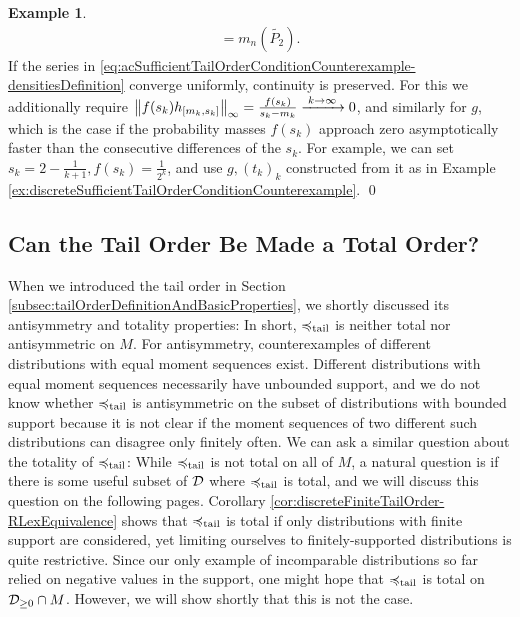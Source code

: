 \documentclass[a4paper,DIV=11]{scrreprt}
\theoremstyle{definition}
\newtheorem{ex}[thm]{Example} %
\begin{document}
\begin{ex}
\begin{multline*}
            = m_n(\tilde{P_2}).
        \end{multline*}
        If the series in \eqref{eq:acSufficientTailOrderConditionCounterexample-densitiesDefinition} converge uniformly, continuity is preserved.
        For this we additionally require $\left\lVert f(s_k) h_{[m_k, s_k]}\right\rVert_\infty = \frac{f(s_k)}{s_k - m_k} \xrightarrow{\;k \to \infty\;} 0$, and similarly for $g$, which is the case if the probability masses $f(s_k)$ approach zero asymptotically faster than the consecutive differences of the $s_k$. For example, we can set $s_k = 2-\frac{1}{k+1}, f(s_k) = \frac{1}{2^k}$, and use $g, (t_k)_k$ constructed from it as in Example \ref{ex:discreteSufficientTailOrderConditionCounterexample}.
        \qed
    \end{ex}
    
    \subsection{Can the Tail Order Be Made a Total Order?}
    \label{subsec:tailOrderTotality}
    When we introduced the tail order in Section \ref{subsec:tailOrderDefinitionAndBasicProperties}, we shortly discussed its antisymmetry and totality properties: In short, $\preccurlyeq_{\text{tail}}$ is neither total nor antisymmetric on $M$. For antisymmetry, counterexamples of different distributions with equal moment sequences exist. Different distributions with equal moment sequences necessarily have unbounded support, and we do not know whether $\preccurlyeq_{\text{tail}}$ is antisymmetric on the subset of distributions with bounded support because it is not clear if the moment sequences of two different such distributions can disagree only finitely often.
    We can ask a similar question about the totality of $\preccurlyeq_{\text{tail}}$: While $\preccurlyeq_{\text{tail}}$ is not total on all of $M$,
    a natural question is if there is some useful subset of $\mathcal{D}$ where $\preccurlyeq_{\text{tail}}$ is total, and we will discuss this question on the following pages.
    Corollary \ref{cor:discreteFiniteTailOrder-RLexEquivalence} shows that $\preccurlyeq_{\text{tail}}$ is total if only distributions with finite support are considered, yet limiting ourselves to finitely-supported distributions is quite restrictive.
    Since our only example of incomparable distributions so far relied on negative values in the support, one might hope that $\preccurlyeq_{\text{tail}}$ is total on $\mathcal{D}_{\geq 0} \cap M$. However, we will show shortly that this is not the case.
    
\end{document}
